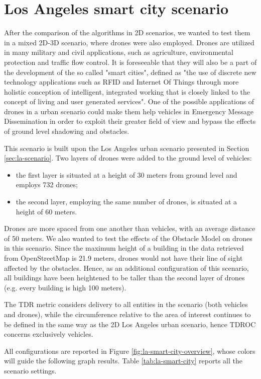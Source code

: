 	\section{Los Angeles smart city scenario}
		After the comparison of the algorithms in 2D scenarios, we wanted to test them in a mixed 2D-3D scenario, where drones were also employed. Drones are utilized in many military and civil applications, such as agriculture, environmental protection and traffic flow control. It is foreseeable that they will also be a part of the development of the so called "smart cities", defined as "the use of discrete new technology applications such as RFID and Internet Of Things through more holistic conception of intelligent, integrated working that is closely linked to the concept of living and user generated services"\cite{smartCity}. One of the possible applications of drones in a urban scenario could make them help vehicles in Emergency Message Dissemination in order to exploit their greater field of view and bypass the effects of ground level shadowing and obstacles. 
		
		
		This scenario is built upon the Los Angeles urban scenario presented in Section \ref{sec:la-scenario}. Two layers of drones were added to the ground level of vehicles: 
		\begin{itemize}
			\item the first layer is situated at a height of 30 meters from ground level and employs 732 drones;
			\item the second layer, employing the same number of drones, is situated at a height of 60 meters.
		\end{itemize}
		Drones are more spaced from one another than vehicles, with an average distance of 50 meters. We also wanted to test the effects of the Obstacle Model on drones in this scenario. Since the maximum height of a building in the data retrieved from OpenStreetMap is 21.9 meters, drones would not have their line of sight affected by the obstacles. Hence, as an additional configuration of this scenario, all buildings have been heightened to be taller than the second layer of drones (e.g. every building is high 100 meters).
		
		
		The TDR metric considers delivery to all entities in the scenario (both vehicles and drones), while the circumference relative to the area of interest continues to be defined in the same way as the 2D Los Angeles urban scenario, hence TDROC concerns exclusively vehicles.
		
		
		All configurations are reported in Figure \ref{fig:la-smart-city-overview}, whose colors will guide the following graph results. Table \ref{tab:la-smart-city} reports all the scenario settings.
		
